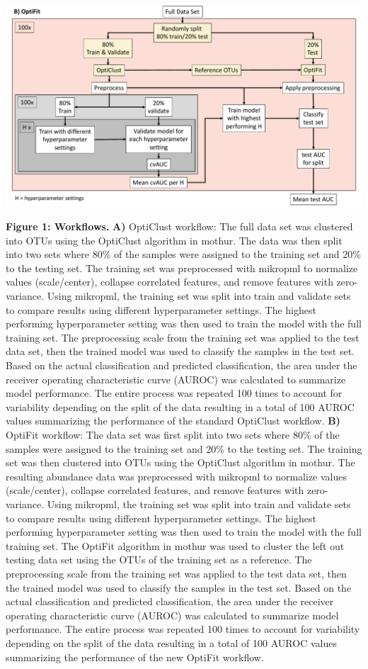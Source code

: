 \documentclass[
]{article}
\begin{document}
\includegraphics{../exploratory/figures/figure1_b.pdf}

\textbf{Figure 1: Workflows.} \textbf{A)} OptiClust workflow: The full
data set was clustered into OTUs using the OptiClust algorithm in
mothur. The data was then split into two sets where 80\% of the samples
were assigned to the training set and 20\% to the testing set. The
training set was preprocessed with mikropml to normalize values
(scale/center), collapse correlated features, and remove features with
zero-variance. Using mikropml, the training set was split into train and
validate sets to compare results using different hyperparameter
settings. The highest performing hyperparameter setting was then used to
train the model with the full training set. The preprocessing scale from
the training set was applied to the test data set, then the trained
model was used to classify the samples in the test set. Based on the
actual classification and predicted classification, the area under the
receiver operating characteristic curve (AUROC) was calculated to
summarize model performance. The entire process was repeated 100 times
to account for variability depending on the split of the data resulting
in a total of 100 AUROC values summarizing the performance of the
standard OptiClust workflow. \textbf{B)} OptiFit workflow: The data set
was first split into two sets where 80\% of the samples were assigned to
the training set and 20\% to the testing set. The training set was then
clustered into OTUs using the OptiClust algorithm in mothur. The
resulting abundance data was preprocessed with mikropml to normalize
values (scale/center), collapse correlated features, and remove features
with zero-variance. Using mikropml, the training set was split into
train and validate sets to compare results using different
hyperparameter settings. The highest performing hyperparameter setting
was then used to train the model with the full training set. The OptiFit
algorithm in mothur was used to cluster the left out testing data set
using the OTUs of the training set as a reference. The preprocessing
scale from the training set was applied to the test data set, then the
trained model was used to classify the samples in the test set. Based on
the actual classification and predicted classification, the area under
the receiver operating characteristic curve (AUROC) was calculated to
summarize model performance. The entire process was repeated 100 times
to account for variability depending on the split of the data resulting
in a total of 100 AUROC values summarizing the performance of the new
OptiFit workflow.
\end{document}
